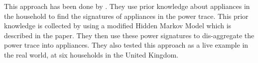 This approach has been done by \citet{NILM}.
They use prior knowledge about appliances in the household to find the signatures of appliances in the power trace.
This prior knowledge is collected by using a modified Hidden Markov Model\cite{kolter2012approximate} which is described in the paper.
They then use these power signatures to dis-aggregate the power trace into appliances.
They also tested this approach as a live example in the real world, at six households in the United Kingdom.
